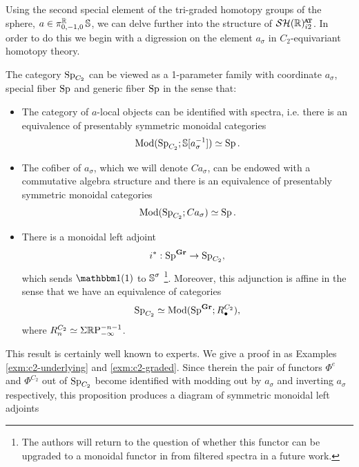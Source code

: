 Using the second special element of the tri-graded homotopy groups of the sphere, $a \in \pi_{0,-1,0}^{\mathbb{R}} \operatorname{\mathbb{S}}$, we can delve further into the structure of $\SHRat$. In order to do this we begin with a digression on the element $a_{\sigma}$ in $C_2$-equivariant homotopy theory.

\begin{prop}
  The category $\operatorname{\mathrm{Sp}}_{C_2}$ can be viewed as a 1-parameter family with coordinate $a_\sigma$, special fiber $\operatorname{\mathrm{Sp}}$ and generic fiber $\operatorname{\mathrm{Sp}}$ in the sense that:
  \begin{itemize}
  \item The category of $a$-local objects can be identified with spectra, i.e.
    there is an equivalence of presentably symmetric monoidal categories
    \[ \mathrm{Mod} ( \operatorname{\mathrm{Sp}}_{C_2} ; \operatorname{\mathbb{S}}[ a_{\sigma}^{-1} ] ) \simeq \operatorname{\mathrm{Sp}}. \]
  \item The cofiber of $a_\sigma$, which we will denote $Ca_\sigma$, can be endowed with a commutative algebra structure and there is an equivalence of presentably symmetric monoidal categories
    \[ \mathrm{Mod} ( \operatorname{\mathrm{Sp}}_{C_2} ; Ca_{\sigma} ) \simeq \operatorname{\mathrm{Sp}}. \]
    \item There is a monoidal left adjoint
      \[ i^* : \operatorname{\mathrm{Sp}}^{\operatorname{\mathbf{Gr}}} \to \operatorname{\mathrm{Sp}}_{C_2}, \]
      which sends $\o(1)$ to $\operatorname{\mathbb{S}}^{\sigma}$ \footnote{The authors will return to the question of whether this functor can be upgraded to a monoidal functor in from filtered spectra in a future work.}. Moreover, this adjunction is affine in the sense that we have an equivalence of categories
      \[ \operatorname{\mathrm{Sp}}_{C_2} \simeq \mathrm{Mod} ( \operatorname{\mathrm{Sp}}^{\operatorname{\mathbf{Gr}}} ; R_\bullet^{C_2}), \]
      where $R_n^{C_2} \simeq \Sigma\mathbb{R} \mathrm{P}^{-n-1}_{-\infty}$.
  \end{itemize}  
\end{prop}

This result is certainly well known to experts. %
We give a proof in  as Examples \ref{exm:c2-underlying} and \ref{exm:c2-graded}.
Since therein the pair of functors $\Phi^e$ and $\Phi^{C_2}$ out of $\operatorname{\mathrm{Sp}}_{C_2}$ become identified with modding out by $a_\sigma$ and inverting $a_\sigma$ respectively, this proposition produces a diagram of symmetric monoidal left adjoints
\begin{center}
\end{center}

